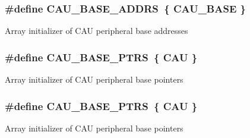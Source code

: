 \subsubsection[{\texorpdfstring{C\+A\+U\+\_\+\+B\+A\+S\+E\+\_\+\+A\+D\+D\+RS}{CAU_BASE_ADDRS}}]{\setlength{\rightskip}{0pt plus 5cm}\#define C\+A\+U\+\_\+\+B\+A\+S\+E\+\_\+\+A\+D\+D\+RS~\{ {\bf C\+A\+U\+\_\+\+B\+A\+SE} \}}\hypertarget{group__CAU__Peripheral__Access__Layer_ga93a57ce0e99e2ff0985950f9452b5777}{}\label{group__CAU__Peripheral__Access__Layer_ga93a57ce0e99e2ff0985950f9452b5777}
Array initializer of C\+AU peripheral base addresses 
\subsubsection[{\texorpdfstring{C\+A\+U\+\_\+\+B\+A\+S\+E\+\_\+\+P\+T\+RS}{CAU_BASE_PTRS}}]{\setlength{\rightskip}{0pt plus 5cm}\#define C\+A\+U\+\_\+\+B\+A\+S\+E\+\_\+\+P\+T\+RS~\{ {\bf C\+AU} \}}\hypertarget{group__CAU__Peripheral__Access__Layer_gaadc82a2eed7dcf40fa9a17abe0f2ff6e}{}\label{group__CAU__Peripheral__Access__Layer_gaadc82a2eed7dcf40fa9a17abe0f2ff6e}
Array initializer of C\+AU peripheral base pointers 
\subsubsection[{\texorpdfstring{C\+A\+U\+\_\+\+B\+A\+S\+E\+\_\+\+P\+T\+RS}{CAU_BASE_PTRS}}]{\setlength{\rightskip}{0pt plus 5cm}\#define C\+A\+U\+\_\+\+B\+A\+S\+E\+\_\+\+P\+T\+RS~\{ {\bf C\+AU} \}}\hypertarget{group__CAU__Peripheral__Access__Layer_gaadc82a2eed7dcf40fa9a17abe0f2ff6e}{}\label{group__CAU__Peripheral__Access__Layer_gaadc82a2eed7dcf40fa9a17abe0f2ff6e}
Array initializer of C\+AU peripheral base pointers 